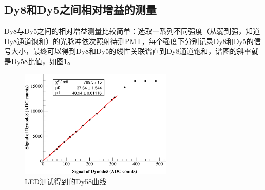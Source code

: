 \subsection{Dy8和Dy5之间相对增益的测量}
\label{sec:pmt_test:dy58}
Dy8与Dy5之间的相对增益测量比较简单：选取一系列不同强度（从弱到强，知道Dy8通道饱和）的光脉冲依次照射待测PMT，每个强度下分别记录Dy8和Dy5的信号大小，最终可以得到Dy8和Dy5的线性关联谱直到Dy8通道饱和，谱图的斜率就是Dy58比值，如图\ref{fig:pmt_test:dy58_example_single}。
\begin{figure}[htbp]
	\centering
	\includegraphics[width=0.65\textwidth]{chap/pmt_test/fig/dy58_example_single.eps}
	\caption{LED测试得到的Dy58曲线}
	\label{fig:pmt_test:dy58_example_single}
\end{figure}

